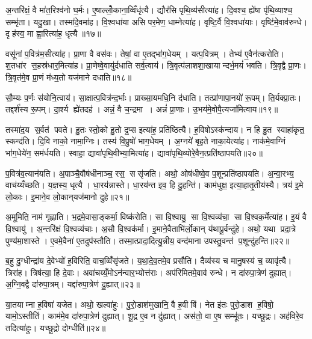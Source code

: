 अ॒न्तरि॑क्षं॒ वै मा॑त॒रिश्व॑नो घ॒र्मः। ए॒षाल्लोँ॒काना॒व्विँधृ॑त्यै। द्यौर॑सि पृथि॒व्य॑सीत्या॑ह। दि॒वश्च॒ ह्ये॑षा पृ॑थि॒व्याश्च॒ सम्भृ॑ता। यदु॒खा। तस्मा॑दे॒वमा॑ह। वि॒श्वधा॑या असि पर॒मेण॒ धाम्नेत्या॑ह। वृष्टि॒र्वै वि॒श्वधा॑याः। वृष्टि॑मे॒वाव॑रुन्धे। दृह॑स्व॒ मा ह्वा॒रित्या॑ह॒ धृत्यै॥१७॥

वसू॑नां प॒वित्र॑म॒सीत्या॑ह। प्रा॒णा वै वस॑वः। तेषां॒ वा ए॒तद्भा॑ग॒धेयम्। यत्प॒वित्रम्। तेभ्य॑ ए॒वैन॑त्करोति। श॒तधा॑र स॒हस्र॑धार॒मित्या॑ह। प्रा॒णेष्वे॒वायु॑र्दधाति सर्व॒त्वाय॑। त्रि॒वृत्प॑लाशशा॒खायान्दर्भ॒मयं॑ भवति। त्रि॒वृद्वै प्रा॒णः। त्रि॒वृत॑मे॒व प्रा॒णं म॑ध्य॒तो यज॑माने दधाति॥१८॥

सौ॒म्यः प॒र्णः स॑योनि॒त्वाय॑। सा॒क्षात्प॒वित्र॑न्द॒र्भाः। प्राख्सा॒यमधि॒नि द॑धाति। तत्प्रा॑णापा॒नयो॑ रू॒पम्। ति॒र्यक्प्रा॒तः। तद्दर्श॑स्य रू॒पम्। दा॒र्श्य ह्ये॑तदह॑। अन्नं॒ वै च॒न्द्रमा। अन्नं॑ प्रा॒णाः। उ॒भय॑मे॒वोपै॒त्यजा॑मित्वाय॥१९॥

तस्मा॑द॒य स॒र्वत॑ पवते। हु॒तः स्तो॒को हु॒तो द्र॒प्स इत्या॑ह॒ प्रति॑ष्ठित्यै। ह॒विषोऽस्क॑न्दाय। न हि हु॒त स्वाहा॑कृत॒ स्कन्द॑ति। दि॒वि नाको॒ नामा॒ग्निः। तस्य॑ वि॒प्रुषो॑ भाग॒धेयम्। अ॒ग्नये॑ बृह॒ते नाका॒येत्या॑ह। नाक॑मे॒वाग्निं भा॑ग॒धेये॑न॒ सम॑र्धयति। स्वाहा॒ द्यावा॑पृथि॒वीभ्या॒मित्या॑ह। द्यावा॑पृथि॒व्योरे॒वैन॒त्प्रति॑ष्ठापयति॥२०॥

प॒वित्र॑व॒त्यान॑यति। अ॒पाञ्चै॒वौष॑धीनाञ्च॒ रस॒ ससृ॑जति। अथो॒ ओष॑धीष्वे॒व प॒शून्प्रति॑ष्ठापयति। अ॒न्वा॒रभ्य॒ वाच॑य्यँच्छति। य॒ज्ञस्य॒ धृत्यै। धा॒रय॑न्नास्ते। धा॒रय॑न्त इव॒ हि दु॒हन्ति॑। काम॑धुक्ष॒ इत्या॒हातृ॒तीय॑स्यै। त्रय॑ इ॒मे लो॒काः। इ॒माने॒व लो॒कान्‌यज॑मानो दुहे॥२१॥

अ॒मूमिति॒ नाम॑ गृह्णाति। भ॒द्रमे॒वासा॒ङ्कर्मा॒ विष्क॑रोति। सा वि॒श्वायु॒ सा वि॒श्वव्य॑चा॒ सा वि॒श्वक॒र्मेत्या॑ह। इ॒यं वै वि॒श्वायु॑। अ॒न्तरि॑क्षं वि॒श्वव्य॑चाः। अ॒सौ वि॒श्वक॑र्मा। इ॒माने॒वैताभि॑र्लो॒कान्‌ य॑थापू॒र्वन्दु॑हे। अथो॒ यथा प्रदा॒त्रे पुण्य॑मा॒शास्ते। ए॒वमे॒वैना॑ ए॒तदुप॑स्तौति। तस्मा॒त्प्रादा॒दित्यु॒न्नीय॒ वन्द॑माना उपस्तु॒वन्त॑ प॒शून्दु॑हन्ति॥२२॥

ब॒हु दु॒ग्धीन्द्रा॑य दे॒वेभ्यो॑ ह॒विरिति॒ वाच॒व्विँसृ॑जते। य॒था॒दे॒व॒तमे॒व प्रसौ॑ति। दैव्य॑स्य च मानु॒षस्य॑ च॒ व्यावृ॑त्यै। त्रिरा॑ह। त्रिष॑त्या॒ हि दे॒वाः। अवा॑चय्यँ॒मोऽन॑न्वार॒भ्योत्त॑राः। अप॑रिमितमे॒वाव॑ रुन्धे। न दा॑रुपा॒त्रेण॑ दुह्यात्। अ॒ग्नि॒वद्वै दा॑रुपा॒त्रम्। यद्दा॑रुपा॒त्रेण॑ दु॒ह्यात्॥२३॥

या॒तयाम्ना ह॒विषा॑ यजेत। अथो॒ खल्वा॑हुः। पु॒रो॒डाश॑मुखानि॒ वै ह॒वीषि॑। नेत इ॑तः पुरो॒डाश ह॒विषो॒ यामो॒ऽस्तीति॑। काम॑मे॒व दा॑रुपा॒त्रेण॑ दुह्यात्। शू॒द्र ए॒व न दु॑ह्यात्। अस॑तो॒ वा ए॒ष सम्भू॑तः। यच्छू॒द्रः। अह॑विरे॒व तदित्या॑हुः। यच्छू॒द्रो दोग्धीति॑॥२४॥

